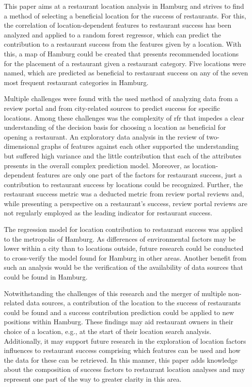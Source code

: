 \documentclass[a4paper, 11pt, oneside]{Thesis}  %
\begin{document}
This paper aims at a restaurant location analysis in Hamburg and strives to find a method of selecting a beneficial location for the success of restaurants. For this, the correlation of location-dependent features to restaurant success has been analyzed and applied to a random forest regressor, which can predict the contribution to a restaurant success from the features given by a location. With this, a map of Hamburg could be created that presents recommended locations for the placement of a restaurant given a restaurant category. Five locations were named, which are predicted as beneficial to restaurant success on any of the seven most frequent restaurant categories in Hamburg.

Multiple challenges were found with the used method of analyzing data from a review portal and from city-related sources to predict success for specific locations. Among these challenges was the complexity of \ac{rfr} that impedes a clear understanding of the decision basis for choosing a location as beneficial for opening a restaurant. An exploratory data analysis in the review of two-dimensional graphs of features against each other supported the understanding but suffered high variance and the little contribution that each of the attributes presents in the overall complex prediction model. Moreover, as location-dependent features are only one part of the factors for restaurant success, just a contribution to restaurant success by locations could be recognized. Further, the restaurant success metric was a deducted metric from review portal reviews and, while presenting a perspective on a restaurant's success, review portal reviews are not regularly employed as the leading indicator for restaurant success.

The regression model for location contribution to restaurant success was applied to the metropolis of Hamburg. As differences of environmental factors may be lower within a city than to locations outside, future research could be conducted to cross-verify the model found for Hamburg in other areas. Another benefit from such an analysis would be the verification of the availability of data sources that could be found in Hamburg.

Notwithstanding the challenges of this research and the merger of multiple non-related data sources, a contribution of the location to the success of restaurants could be found and a success contribution prediction could be applied to new positions within Hamburg. These findings may aid restaurant owners in their choice of a location, e.g., at the start of their location search analysis. Additionally, it may support future research in the exploration of location factors influences to restaurant success comprising which features can be used and how the data for these can be retrieved. In this manner, this paper adds knowledge about the composition of success factors to restaurant location analyses and may represent one part of the way to greater clarity in this area.
\end{document}
